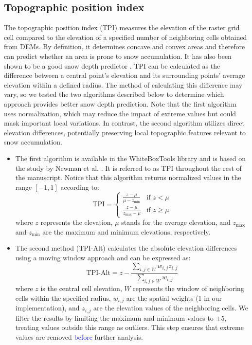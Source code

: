 \documentclass[preprint,12pt]{elsarticle}
\begin{document}
\subsection{Topographic position index} \label{sec_tpi}

The topographic position index (TPI) measures the elevation of the raster grid cell compared to the elevation of a specified number of neighboring cells obtained from DEMs. By definition, it determines concave and convex areas and therefore can predict whether an area is prone to snow accumulation. It has also been shown to be a good snow depth predictor \cite{revuelto2020random, daudt2023snow}. TPI can be calculated as the difference between a central point's elevation and its surrounding points' average elevation within a defined radius. The method of calculating this difference may vary, so we tested the two algorithms described below to determine which approach provides better snow depth prediction. Note that the first algorithm uses normalization, which may reduce the impact of extreme values but could mask important local variations. In contrast, the second algorithm utilizes direct elevation differences, potentially preserving local topographic features relevant to snow accumulation.

\begin{itemize}
    \item The first algorithm is available in the WhiteBoxTools library \cite{lindsay2014whitebox} and is based on the study by Newman et al. \cite{newman2018evaluating}. It is referred to as TPI throughout the rest of the manuscript. Notice that this algorithm returns normalized values in the range $[-1, 1]$ according to:
    \begin{equation}
        \text{TPI} =
        \begin{cases}
            \frac{z - \mu}{\mu - z_{\text{min}}} & \text{if } z < \mu \\ 
            \frac{z - \mu}{z_{\text{max}} - \mu} & \text{if } z \geq \mu
        \end{cases}
    \end{equation}
    \noindent where $z$ represents the elevation, $\mu$ stands for the average elevation, and $z_{\text{max}}$ and $z_{\text{min}}$ are the maximum and minimum elevations, respectively.
    
    \item The second method (TPI-Alt) calculates the absolute elevation differences using a moving window approach and can be expressed as:
    \begin{equation}
            \text{TPI-Alt} = z - \frac{\sum_{i,j \in W} w_{i,j}z_{i,j}}{\sum_{i,j \in W} w_{i,j}}
    \end{equation}
    \noindent where $z$ is the central cell elevation, $W$ represents the window of neighboring cells within the specified radius, $w_{i,j}$ are the spatial weights (1 in our implementation), and $z_{i,j}$ are the elevation values of the neighboring cells. We filter the results by limiting the maximum and minimum values to $\pm5$, treating values outside this range as outliers. This step ensures that extreme values are removed \textcolor{blue}{before} further analysis.
\end{itemize}
\end{document}
